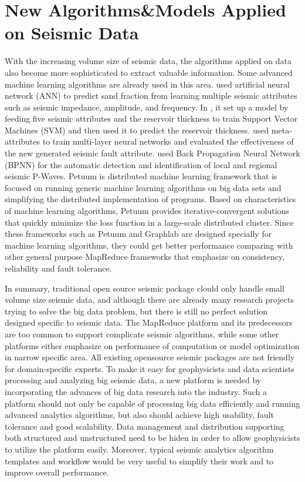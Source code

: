 \section{New Algorithms\&Models Applied on Seismic Data}
With the increasing volume size of seismic data, the algorithms applied on data also become more sophisticated to extract valuable information. Some advanced machine learning algorithms are already used in this area. \cite{7067356ChakiPredictSandNeuralNetwork} used artificial neural network (ANN) to predict sand fraction from learning multiple seismic attributes such as seismic impedance, amplitude, and frequency. In \cite{6234749DengSVMPredictReservoir}, it set up a model by feeding five seismic attributes and the reservoir thickness to train Support Vector Machines (SVM) and then used it to predict the reservoir thickness. \cite{4026836MachadoNerualNetworksFault} used meta-attributes to train multi-layer neural networks and evaluated the effectiveness of the new generated seismic fault attribute. \cite{6707117KaurPWaveANN} used Back Propagation Neural Network (BPNN) for the automatic detection and identification of local and regional seismic P-Waves. 
Petuum \cite{Dai2013Petuum} is distributed machine learning framework that is focused on running generic machine learning algorithms on big data sets and simplifying the distributed implementation of programs. Based on characteristics of machine learning algorithms, Petuum provides iterative-convergent solutions that quickly minimize the loss function in a large-scale distributed cluster. Since these frameworks such as Petuum and Graphlab \cite{DatoGraphLab} are designed specially for machine learning algorithms, they could get better performance comparing with other general purpose MapReduce frameworks that emphasize on consistency, reliability and fault tolerance. 

In summary, traditional open source seismic package clould only handle small volume size seismic data, and although there are already many research projects trying to solve the big data problem, but there is still no perfect solution designed specific to seismic data. The MapReduce platform and its predecessors are too common to support complicate seismic algorithms, while some other platforms either emphasize on performance of computation or model optimization in narrow specific area. All existing opensource seismic packages are not friendly for domain-specific experts.
To make it easy for geophysicists and data scientists processing and analyzing big seismic data, a new platform is needed by incorporating the advances of big data research into the industry. Such a platform should not only be capable of processing big data efficiently and running advanced analytics algorithms, but also should achieve high usability, fault tolerance and good scalability. Data management and distribution supporting both structured and unstructured need to be hiden in order to allow geophysicists to utilize the platform easily. Moreover, typical seismic analytics algorithm templates and workflow would be very useful to simplify their work and to improve overall performance. 


